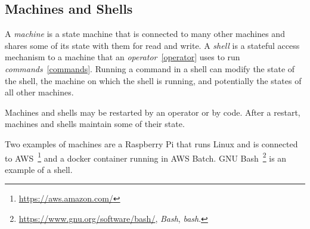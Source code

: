 \subsection{Machines and Shells}
\label{machine}

A \emph{machine} is a state machine that is connected to many other machines and shares some of its state with them for read and write. A \emph{shell} is a stateful access mechanism to a machine that an \emph{operator}~\ref{operator} uses to run \emph{commands}~\ref{commands}. Running a command in a shell can modify the state of the shell, the machine on which the shell is running, and potentially the states of all other machines. 

Machines and shells may be restarted by an operator or by code. After a restart, machines and shells maintain some of their state. 

Two examples of machines are a Raspberry Pi that runs Linux and is connected to AWS~\footnote{\url{https://aws.amazon.com/}} and a docker container running in AWS Batch. GNU Bash~\footnote{\url{https://www.gnu.org/software/bash/}, \emph{Bash}, \emph{bash}.} is an example of a shell.